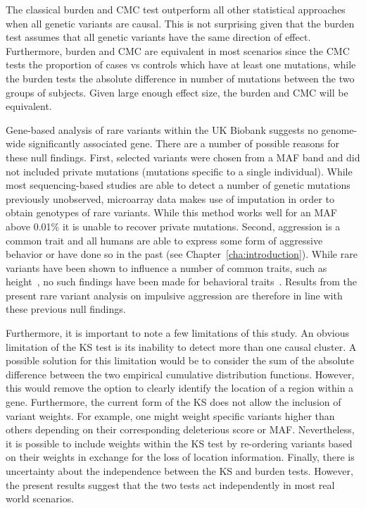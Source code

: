 The classical burden and CMC test outperform all other statistical approaches when all genetic variants are causal.
This is not surprising given that the burden test assumes that all genetic variants have the same direction of effect.
Furthermore, burden and CMC are equivalent in most scenarios since the CMC tests the proportion of cases vs controls which have at least one mutations, while the burden tests the absolute difference in number of  mutations between the two groups of subjects.
Given large enough effect size, the burden and CMC will be equivalent.

Gene-based analysis of rare variants within the UK Biobank suggests no genome-wide significantly associated gene.
There are a number of possible reasons for these null findings.
First, selected variants were chosen from a MAF band and did not included private mutations (mutations specific to a single individual).
While most sequencing-based studies are able to detect a number of genetic mutations previously unobserved, microarray data makes use of imputation in order to obtain genotypes of rare variants.
While this method works well for an MAF above 0.01\% it is unable to recover private mutations.
Second, aggression is a common trait and all humans are able to express some form of aggressive behavior or have done so in the past (see Chapter~\ref{cha:introduction}).
While rare variants have been shown to  influence a number of common traits, such as height~\cite{Marouli2017}, no such findings have been made for behavioral traits~\cite{Chabris2015}.
Results from the present rare variant analysis on impulsive aggression are therefore in line with these previous null findings.

Furthermore, it is important to note a few limitations of this study.
An obvious limitation of the KS test is its inability to detect more than one causal cluster.
A possible solution for this limitation would be to consider the sum of the absolute difference between the two empirical cumulative distribution functions. 
However, this would remove the option to clearly identify the location of a region within a gene. 
Furthermore, the current form of the KS does not allow the inclusion of variant weights.
For example, one might  weight specific variants higher than others depending  on their corresponding deleterious score or MAF\@.
Nevertheless, it is possible to include weights within the KS test by re-ordering variants based on their weights in exchange for the loss of location information.
Finally, there is  uncertainty about the independence between the KS and burden tests.
However, the  present results suggest that the two tests act independently in most real world scenarios.  


